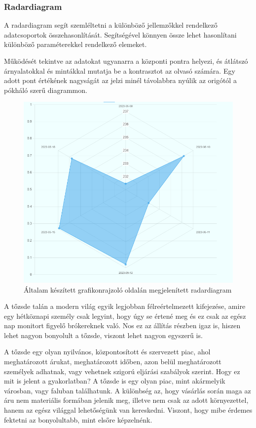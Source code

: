 \subsubsection{Radardiagram}

A radardiagram segít szemléltetni a különböző jellemzőkkel rendelkező adatcsoportok összehasonlítását. Segítségével könnyen össze lehet hasonlítani különböző paraméterekkel rendelkező elemeket. 

	Működését tekintve az adatokat ugyanarra a központi pontra helyezi, és átlátszó árnyalatokkal és mintákkal mutatja be a kontrasztot az olvasó számára. Egy adott pont értékének nagyságát az jelzi minél távolabbra nyúlik az origótól a pókháló szerű diagrammon.

\begin{figure}[h]
\centering
\includegraphics[scale=0.4]{images/radarChartExample}
\caption{Általam készített grafikonrajzoló oldalán megjelenített radardiagram}
\end{figure}


A tőzsde talán a modern világ egyik legjobban félreértelmezett kifejezése, amire egy hétköznapi személy csak legyint, hogy úgy se értené meg és ez csak az egész nap monitort figyelő brókereknek való. Nos ez az állítás részben igaz is, hiszen lehet nagyon bonyolult a tőzsde, viszont lehet nagyon egyszerű is.

	A tőzsde egy olyan nyilvános, központosított és szervezett piac, ahol meghatározott árukat, meghatározott időben, azon belül meghatározott személyek adhatnak, vagy vehetnek szigorú eljárási szabályok szerint.  Hogy ez mit is jelent a gyakorlatban? A tőzsde is egy olyan piac, mint akármelyik városban, vagy faluban találhatunk. A különbség az, hogy vásárlás során maga az áru nem materiális formában jelenik meg, illetve nem csak az adott környezettel, hanem az egész világgal lehetőségünk van kereskedni. Viszont, hogy mibe érdemes fektetni az bonyolultabb, mint elsőre képzelnénk. \cite{wikiStock}
	
